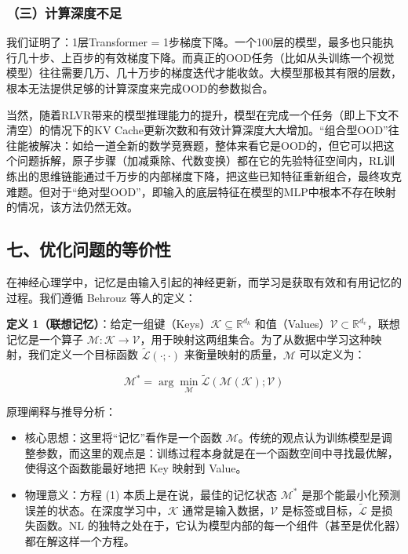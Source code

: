 \hypertarget{ux4e09ux8ba1ux7b97ux6df1ux5ea6ux4e0dux8db3}{%
\subsubsection{（三）计算深度不足}\label{ux4e09ux8ba1ux7b97ux6df1ux5ea6ux4e0dux8db3}}

我们证明了：1层Transformer = 1步梯度下降。一个100层的模型，最多也只能执行几十步、上百步的有效梯度下降。而真正的OOD任务（比如从头训练一个视觉模型）往往需要几万、几十万步的梯度迭代才能收敛。大模型那极其有限的层数，根本无法提供足够的计算深度来完成OOD的参数拟合。

当然，随着RLVR带来的模型推理能力的提升，模型在完成一个任务（即上下文不清空）的情况下的KV Cache更新次数和有效计算深度大大增加。``组合型OOD''往往能被解决：如给一道全新的数学竞赛题，整体来看它是OOD的，但它可以把这个问题拆解，原子步骤（加减乘除、代数变换）都在它的先验特征空间内，RL训练出的思维链能通过千万步的内部梯度下降，把这些已知特征重新组合，最终攻克难题。但对于``绝对型OOD''，即输入的底层特征在模型的MLP中根本不存在映射的情况，该方法仍然无效。

\hypertarget{ux4e03ux4f18ux5316ux95eeux9898ux7684ux7b49ux4ef7ux6027}{%
\subsection{七、优化问题的等价性}\label{ux4e03ux4f18ux5316ux95eeux9898ux7684ux7b49ux4ef7ux6027}}

在神经心理学中，记忆是由输入引起的神经更新，而学习是获取有效和有用记忆的过程。我们遵循 Behrouz 等人的定义：

\textbf{定义 1（联想记忆）}：给定一组键（Keys）\(\mathcal{K}\subseteq\mathbb{R}^{d_k}\) 和值（Values）\(\mathcal{V}\subset\mathbb{R}^{d_v}\)，联想记忆是一个算子 \(\mathcal{M}:\mathcal{K}\to\mathcal{V}\)，用于映射这两组集合。为了从数据中学习这种映射，我们定义一个目标函数 \(\tilde{\mathcal{L}}(\cdot;\cdot)\) 来衡量映射的质量，\(\mathcal{M}\) 可以定义为：

\[
\mathcal{M}^*=\arg\min_{\mathcal{M}}\tilde{\mathcal{L}}(\mathcal{M}(\mathcal{K});\mathcal{V})
\tag{1}
\]

原理阐释与推导分析：

\begin{itemize}
\tightlist
\item
  核心思想：这里将``记忆''看作是一个函数 \(\mathcal{M}\)。传统的观点认为训练模型是调整参数，而这里的观点是：训练过程本身就是在一个函数空间中寻找最优解，使得这个函数能最好地把 Key 映射到 Value。
\item
  物理意义：方程 (1) 本质上是在说，最佳的记忆状态 \(\mathcal{M}^*\) 是那个能最小化预测误差的状态。在深度学习中，\(\mathcal{K}\) 通常是输入数据，\(\mathcal{V}\) 是标签或目标，\(\tilde{\mathcal{L}}\) 是损失函数。NL 的独特之处在于，它认为模型内部的每一个组件（甚至是优化器）都在解这样一个方程。
\end{itemize}


